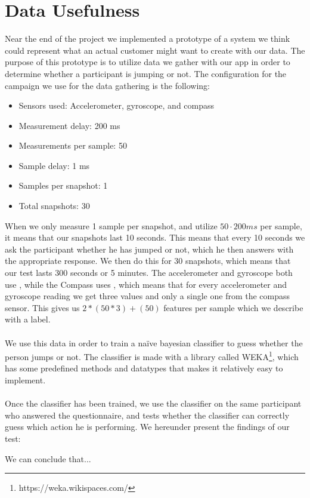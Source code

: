 
\section{Data Usefulness}
\label{sec:data_usefulness}

Near the end of the project we implemented a prototype of a system we think could represent what an actual customer might want to create with our data. The purpose of this prototype is to utilize data we gather with our app in order to determine whether a participant is jumping or not. The configuration for the campaign we use for the data gathering is the following:

\begin{itemize}
    \setlength\itemsep{-0.2em}
    \item Sensors used: Accelerometer, gyroscope, and compass
    \item Measurement delay: 200 ms
    \item Measurements per sample: 50
    \item Sample delay: 1 ms
    \item Samples per snapshot: 1
    \item Total snapshots: 30
\end{itemize}

When we only measure 1 sample per snapshot, and utilize $50 \cdot 200ms$ per sample, it means that our snapshots last 10 seconds. This means that every 10 seconds we ask the participant whether he has jumped or not, which he then answers with the appropriate response. We then do this for 30 snapshots, which means that our test lasts 300 seconds or 5 minutes. The accelerometer and gyroscope both use , while the Compass uses , which means that for every accelerometer and gyroscope reading we get three values and only a single one from the compass sensor. This gives us $2*(50 * 3) + (50)$ features per sample which we describe with a label. 
\\\\
We use this data in order to train a naïve bayesian classifier to guess whether the person jumps or not. The classifier is made with a library called WEKA\footnote{https://weka.wikispaces.com/}, which has some predefined methods and datatypes that makes it relatively easy to implement. 
\\\\
Once the classifier has been trained, we use the classifier on the same participant who answered the questionnaire, and tests whether the classifier can correctly guess which action he is performing. We hereunder present the findings of our test: 


We can conclude that...

